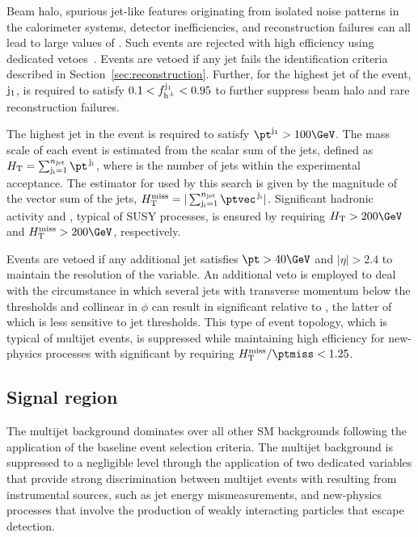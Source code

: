 Beam halo, spurious jet-like features originating from isolated noise
patterns in the calorimeter systems, detector inefficiencies, and
reconstruction failures can all lead to large values of \ptmiss. Such
events are rejected with high efficiency using dedicated
vetoes~\cite{CMS-PAS-JME-16-004, Khachatryan:2014gga}. Events are
vetoed if any jet fails the identification criteria described in
Section~\ref{sec:reconstruction}. Further, \fh for the highest \pt jet
of the event, $\mathrm{j}_\text{1}$, is required to satisfy $0.1 < f_{\mathrm{h}^{\pm}}^{\mathrm{j}_\text{1}} <
0.95$ to further suppress beam halo and rare reconstruction failures.

The highest \pt jet in the event is required to satisfy $\pt^{\jet{1}}
> 100\GeV$. The mass scale of each event is estimated from the scalar
\pt sum of the jets, defined as $\scalht = \sum_{\jet{i} = 1}^{\njet}
\pt^{\,\jet{i}}$, where \njet is the number of jets within the
experimental acceptance. The estimator for \ptvecmiss used by this
search is given by the magnitude of the vector \pt sum of the jets,
$\mht = |\sum_{\jet{i} = 1}^{\njet} \ptvec^{\,\jet{i}}|$. Significant
hadronic activity and \ptvecmiss, typical of SUSY processes, is
ensured by requiring $\scalht > 200\GeV$ and $\mht > 200\GeV$,
respectively.

Events are vetoed if any additional jet satisfies $\pt > 40\GeV$ and
$|\eta| > 2.4$ to maintain the resolution of the \mht variable.  An
additional veto is employed to deal with the circumstance in which
several jets with transverse momentum below the \pt thresholds and
collinear in $\phi$ can result in significant \mht relative to
\ptmiss, the latter of which is less sensitive to jet thresholds. This
type of event topology, which is typical of multijet events, is
suppressed while maintaining high efficiency for new-physics processes
with significant \ptvecmiss by requiring $\mhtmet < 1.25$.

\subsection{Signal region}
\label{sec:signal}

The multijet background dominates over all other SM backgrounds
following the application of the baseline event selection
criteria. The multijet background is suppressed to a negligible level
through the application of two dedicated variables that provide strong
discrimination between multijet events with \ptvecmiss resulting from
instrumental sources, such as jet energy mismeasurements, and
new-physics processes that involve the production of weakly
interacting particles that escape detection.

